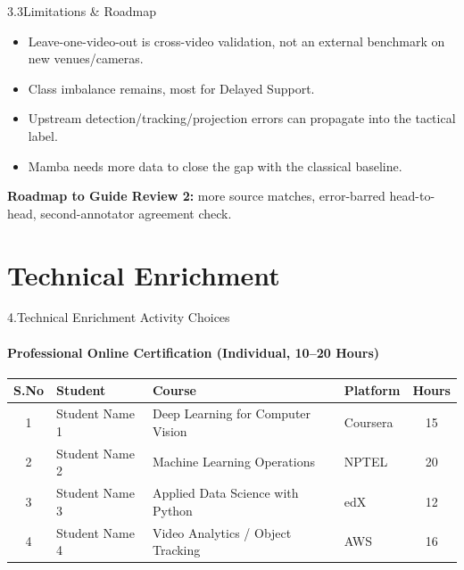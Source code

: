 \documentclass[aspectratio=169, 11pt]{beamer}
\renewcommand{\arraystretch}{1.15}
\begin{document}
\begin{frame}[t]{3.3\quad Limitations \& Roadmap}
    \small
    \begin{itemize}
        \item Leave-one-video-out is cross-video validation, not an
              external benchmark on new venues/cameras.
        \item Class imbalance remains, most for Delayed Support.
        \item Upstream detection/tracking/projection errors can propagate
              into the tactical label.
        \item Mamba needs more data to close the gap with the classical
              baseline.
    \end{itemize}
    \vspace{0.2cm}\footnotesize
    \textbf{Roadmap to Guide Review 2:} more source matches, error-barred
    head-to-head, second-annotator agreement check.
\end{frame}

\section{Technical Enrichment}

\begin{frame}{4.\quad Technical Enrichment Activity Choices}
    \framesubtitle{Professional Online Certification (Individual, 10--20 Hours)}
    \begin{table}
        \centering \footnotesize \renewcommand{\arraystretch}{1.15}
        \begin{tabular}{|c|p{2.8cm}|p{5.0cm}|p{2.3cm}|c|}
            \hline \textbf{S.No} & \textbf{Student} & \textbf{Course} & \textbf{Platform} & \textbf{Hours} \\ \hline
            1 & Student Name 1 & Deep Learning for Computer Vision & Coursera & 15 \\ \hline
            2 & Student Name 2 & Machine Learning Operations & NPTEL & 20 \\ \hline
            3 & Student Name 3 & Applied Data Science with Python & edX & 12 \\ \hline
            4 & Student Name 4 & Video Analytics / Object Tracking & AWS & 16 \\ \hline
        \end{tabular}
    \end{table}
\end{frame}
\end{document}
